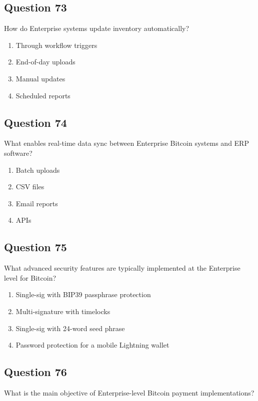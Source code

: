 \documentclass[12pt,a4paper]{article}
\begin{document}
\bigskip


\subsection*{Question 73}
How do Enterprise systems update inventory automatically?

\begin{enumerate}[label=\Alph*., leftmargin=*]
\item Through workflow triggers
\item End-of-day uploads
\item Manual updates
\item Scheduled reports
\end{enumerate}

\bigskip


\subsection*{Question 74}
What enables real-time data sync between Enterprise Bitcoin systems and ERP software?

\begin{enumerate}[label=\Alph*., leftmargin=*]
\item Batch uploads
\item CSV files
\item Email reports
\item APIs
\end{enumerate}

\bigskip


\subsection*{Question 75}
What advanced security features are typically implemented at the Enterprise level for Bitcoin?

\begin{enumerate}[label=\Alph*., leftmargin=*]
\item Single-sig with BIP39 passphrase protection
\item Multi-signature with timelocks
\item Single-sig with 24-word seed phrase
\item Password protection for a mobile Lightning wallet
\end{enumerate}

\bigskip


\subsection*{Question 76}
What is the main objective of Enterprise-level Bitcoin payment implementations?
\end{document}
